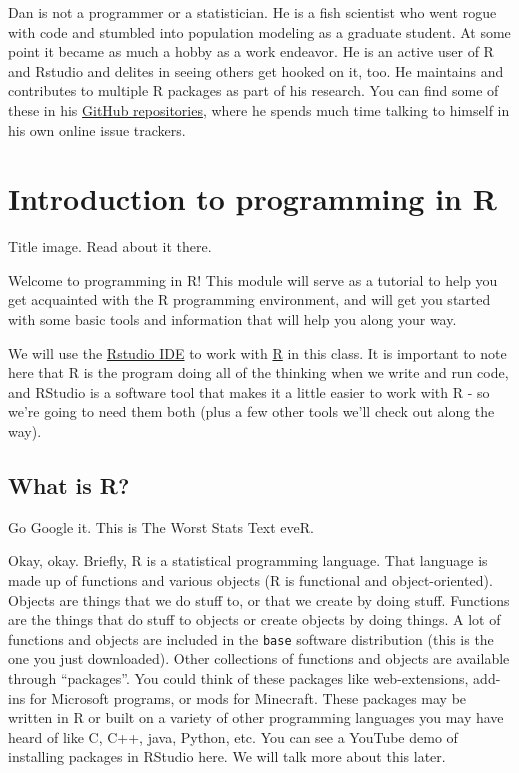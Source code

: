 \documentclass[
]{book}
\begin{document}
Dan is not a programmer or a statistician. He is a fish scientist who went rogue with code and stumbled into population modeling as a graduate student. At some point it became as much a hobby as a work endeavor. He is an active user of R and Rstudio and delites in seeing others get hooked on it, too. He maintains and contributes to multiple R packages as part of his research. You can find some of these in his \href{https://github.com/danStich}{GitHub repositories}, where he spends much time talking to himself in his own online issue trackers.

\hypertarget{Chapter1}{%
\chapter{Introduction to programming in R}\label{Chapter1}}

Title image. Read about it \protect\hypertarget{title}{}{there}.

Welcome to programming in R! This module will serve as a tutorial to help you get acquainted with the R programming environment, and will get you started with some basic tools and information that will help you along your way.

We will use the \href{https://rstudio.com/}{Rstudio IDE} to work with \href{https://www.r-project.org/}{R} in this class. It is important to note here that R is the program doing all of the thinking when we write and run code, and RStudio is a software tool that makes it a little easier to work with R - so we're going to need them both (plus a few other tools we'll check out along the way).

\hypertarget{what-is-r}{%
\section{What is R?}\label{what-is-r}}

Go Google it. This is The Worst Stats Text eveR.

Okay, okay. Briefly, R is a statistical programming language. That language is made up of functions and various objects (R is functional and object-oriented). Objects are things that we do stuff to, or that we create by doing stuff. Functions are the things that do stuff to objects or create objects by doing things. A lot of functions and objects are included in the \texttt{base} software distribution (this is the one you just downloaded). Other collections of functions and objects are available through ``packages''. You could think of these packages like web-extensions, add-ins for Microsoft programs, or mods for Minecraft. These packages may be written in R or built on a variety of other programming languages you may have heard of like C, C++, java, Python, etc. You can see a YouTube demo of installing packages in RStudio here. We will talk more about this later.
\end{document}
